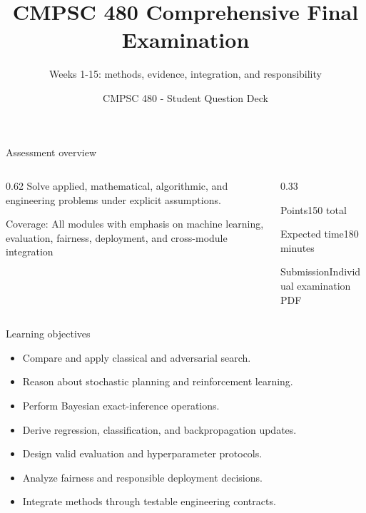 \documentclass[aspectratio=169,11pt]{beamer}
\title[Final Examination Questions]{CMPSC 480 Comprehensive Final Examination}
\subtitle{Weeks 1-15: methods, evidence, integration, and responsibility}
\author{CMPSC 480 - Student Question Deck}
\date{}
\begin{document}
\begin{frame}
  \titlepage
\end{frame}

\begin{frame}{Assessment overview}
\begin{columns}[T,onlytextwidth]
\begin{column}{0.62\textwidth}
\Large Solve applied, mathematical, algorithmic, and engineering problems under explicit assumptions.

\vspace{0.35cm}
\normalsize
Coverage: All modules with emphasis on machine learning, evaluation, fairness, deployment, and cross-module integration
\end{column}
\begin{column}{0.33\textwidth}
\begin{block}{Points}150 total\end{block}
\begin{block}{Expected time}180 minutes\end{block}
\begin{block}{Submission}Individual examination PDF\end{block}
\end{column}
\end{columns}
\end{frame}

\begin{frame}{Learning objectives}
\begin{itemize}
  \item Compare and apply classical and adversarial search.
  \item Reason about stochastic planning and reinforcement learning.
  \item Perform Bayesian exact-inference operations.
  \item Derive regression, classification, and backpropagation updates.
  \item Design valid evaluation and hyperparameter protocols.
  \item Analyze fairness and responsible deployment decisions.
  \item Integrate methods through testable engineering contracts.
\end{itemize}
\end{frame}
\end{document}
